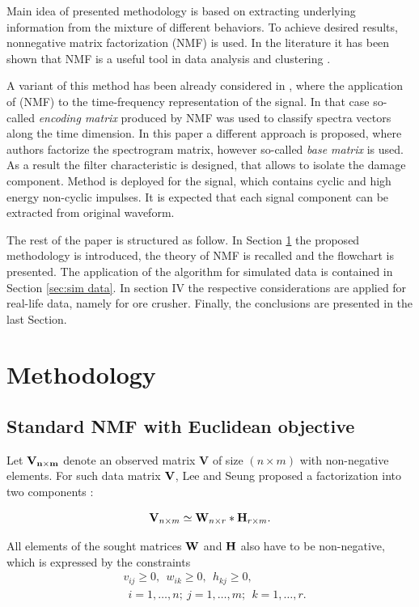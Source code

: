 \documentclass[preprint,12pt]{elsarticle}
\newcommand{\beq}{\begin{equation}}
\newcommand{\eeq}{\end{equation}}
\begin{document}
Main idea of presented methodology is based on extracting underlying information from the mixture of different behaviors. To achieve desired results, nonnegative matrix factorization (NMF) is used. In the literature it has been shown that NMF is a useful tool in data analysis and clustering \cite{cichocki2009nonnegative, zdunek2008data, wang2013nonnegative, lee1999learning, lee2001algorithms, he2011symmetric}.

A variant of this method has been already considered in \cite{wodecki2017local}, where the application of (NMF) to the time-frequency representation of the signal. In that case so-called \emph{encoding matrix} produced by NMF was used to classify spectra vectors along the time dimension. In this paper a different approach is proposed, where authors factorize the spectrogram matrix, however so-called \emph{base matrix} is used. As a result the filter characteristic is designed, that allows to isolate the damage component. Method is deployed for the signal, which contains cyclic and high energy non-cyclic impulses. It is expected that each signal component can be extracted from original waveform. 


The rest of the paper is structured as follow. In Section \ref{sec:methodology} the proposed methodology is introduced, the theory of NMF is recalled and the flowchart is presented. The application of the algorithm for simulated data is contained in Section \ref{sec:sim data}. In section IV the respective considerations are applied for real-life data, namely for ore crusher. Finally, the conclusions are presented in the last Section.

\section{Methodology}
\label{sec:methodology}
\subsection{Standard NMF with Euclidean objective}

Let $\bf{V}_{n\times m}$ denote an observed matrix {\bf  V} of size $(n\times m)$ with non-negative elements. For such data matrix ${\bf V}$, Lee and Seung  proposed a factorization into two components \cite{lee2001algorithms}:

\beq\label{V1} {\bf V}_{n\times m}\simeq
      {\bf W}_{n\times r}*{\bf H}_{r\times m}. \eeq
      
All elements of the sought matrices ${\bf W}$ and ${\bf H}$ also have to be
non-negative, which is expressed by the constraints
\begin{align*}
    &v_{ij}\ge0,~~w_{ik}\ge 0,~~ h_{kj}\ge 0,\\
    &~~i=1, \dots, n; ~j=1,\dots, m;
                ~~k=1,\dots,r.
\end{align*}
\end{document}

